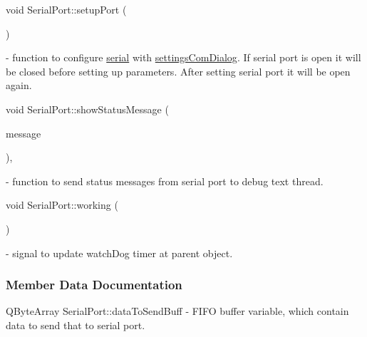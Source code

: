 \mbox{\label{classSerialPort_adf0c6d9bd0a312ae0e921085497fa8b4}} 
{\footnotesize\ttfamily void Serial\+Port\+::\texorpdfstring{setup\+Port}{setupPort} (\begin{DoxyParamCaption}{ }\end{DoxyParamCaption})\hspace{0.3cm}{\ttfamily [slot]}} - function to configure \hyperlink{classSerialPort_a54120d9040537e637eae7e8c048dec31}{serial} with  \hyperlink{classSerialPort_a9ab445f818748122d3368fd2e9dbbbea}{settings\+Com\+Dialog}.  If serial port is open it will be closed before setting up parameters. After setting serial port it will be open again.


\mbox{\label{classSerialPort_a9153ab33cbb73d5138b871e52c343e58}} 
{\footnotesize\ttfamily void Serial\+Port\+::\texorpdfstring{show\+Status\+Message}{showStatusMessage} (\begin{DoxyParamCaption}\item[{const Q\+String \&}]{message }\end{DoxyParamCaption})\hspace{0.3cm}{\ttfamily [private]}, {\ttfamily [slot]}} - function to send status messages from serial port to debug text thread.

\mbox{\label{classSerialPort_ae92426fd329e2a5ec42b0255c5dcbdc5}} 
{\footnotesize\ttfamily void Serial\+Port\+::\texorpdfstring{working}{working} (\begin{DoxyParamCaption}{ }\end{DoxyParamCaption})\hspace{0.3cm}{\ttfamily [signal]}} - signal to update watch\+Dog timer at parent object.



\subsubsection{Member Data Documentation}
\mbox{\label{classSerialPort_abc55095109004eb5e21e923c25036549}} 
{\footnotesize\ttfamily Q\+Byte\+Array Serial\+Port\+::\texorpdfstring{data\+To\+Send\+Buff}{dataToSendBuff}\hspace{0.3cm}{\ttfamily [private]}} - FIFO buffer variable, which contain data to send that to serial port.

